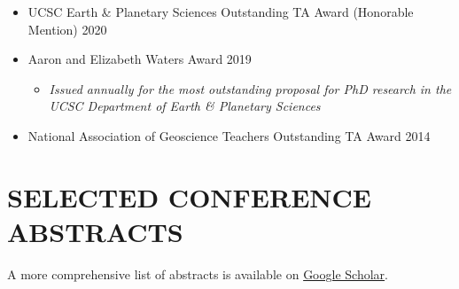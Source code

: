 \documentclass[10pt]{article}
\begin{document}
\begin{itemize} [leftmargin=0pt,label={},itemsep=1ex]
	\item UCSC Earth \& Planetary Sciences Outstanding TA Award (Honorable Mention) \hfill 2020
	\item Aaron and Elizabeth Waters Award  \hfill 2019
	\begin{itemize} [label={}, rightmargin=30ex]
	\item \textit{Issued annually for the most outstanding proposal for PhD research in the UCSC Department of Earth \& Planetary Sciences}
	\end{itemize}
	\item National Association of Geoscience Teachers Outstanding TA Award \hfill 2014
\end{itemize}



\section*{SELECTED CONFERENCE ABSTRACTS}

\begin{center} A more comprehensive list of abstracts is available on \href{https://scholar.google.com/citations?user=KHLOvgcAAAAJ&hl=en}{Google Scholar}. \end{center}
\end{document}
